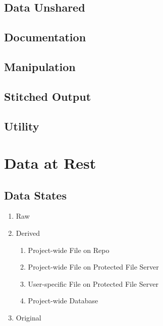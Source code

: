 \documentclass[
]{book}
\providecommand{\tightlist}{%
  \setlength{\itemsep}{0pt}\setlength{\parskip}{0pt}}
\begin{document}
\hypertarget{repo-data-unshared}{%
\section{Data Unshared}\label{repo-data-unshared}}

\hypertarget{repo-documentation}{%
\section{Documentation}\label{repo-documentation}}

\hypertarget{repo-manipulation}{%
\section{Manipulation}\label{repo-manipulation}}

\hypertarget{repo-stitched}{%
\section{Stitched Output}\label{repo-stitched}}

\hypertarget{repo-utility}{%
\section{Utility}\label{repo-utility}}

\hypertarget{rest}{%
\chapter{Data at Rest}\label{rest}}

\hypertarget{data-states}{%
\section{Data States}\label{data-states}}

\begin{enumerate}
\def\labelenumi{\arabic{enumi}.}
\tightlist
\item
  Raw
\item
  Derived

  \begin{enumerate}
  \def\labelenumii{\arabic{enumii}.}
  \tightlist
  \item
    Project-wide File on Repo
  \item
    Project-wide File on Protected File Server
  \item
    User-specific File on Protected File Server
  \item
    Project-wide Database
  \end{enumerate}
\item
  Original
\end{enumerate}
\end{document}
